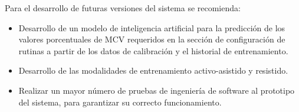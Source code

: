 \begin{recommendations}
    Para el desarrollo de futuras versiones del sistema se recomienda: 
    \begin{itemize}
        \item Desarrollo de un modelo de inteligencia artificial para la predicción de los valores porcentuales de MCV requeridos en la sección de configuración de rutinas a partir de los datos de calibración y el historial de entrenamiento.
        \item Desarrollo de las modalidades de entrenamiento activo-asistido y resistido.
        \item Realizar un mayor número de pruebas de ingeniería de software al prototipo del sistema, para garantizar su correcto funcionamiento.
    \end{itemize}
\end{recommendations}